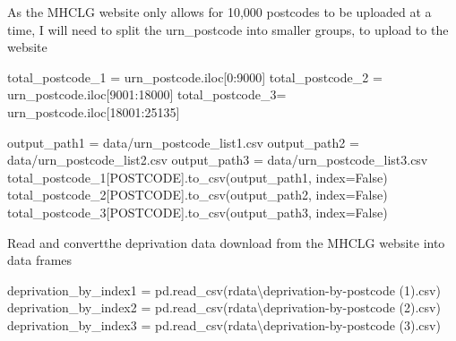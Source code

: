 \documentclass[
  letterpaper,
  DIV=11,
  numbers=noendperiod]{scrartcl}
\newenvironment{Shaded}{\begin{snugshade}}{\end{snugshade}}
\newcommand{\DecValTok}[1]{\textcolor[rgb]{0.68,0.00,0.00}{#1}}
\newcommand{\NormalTok}[1]{\textcolor[rgb]{0.00,0.23,0.31}{#1}}
\newcommand{\OperatorTok}[1]{\textcolor[rgb]{0.37,0.37,0.37}{#1}}
\newcommand{\StringTok}[1]{\textcolor[rgb]{0.13,0.47,0.30}{#1}}
\newcommand{\VariableTok}[1]{\textcolor[rgb]{0.07,0.07,0.07}{#1}}
\newcommand{\VerbatimStringTok}[1]{\textcolor[rgb]{0.13,0.47,0.30}{#1}}
\begin{document}
As the MHCLG website only allows for 10,000 postcodes to be uploaded at
a time, I will need to split the urn\_postcode into smaller groups, to
upload to the website

\begin{Shaded}
\begin{Highlighting}[]
\NormalTok{total\_postcode\_1 }\OperatorTok{=}\NormalTok{ urn\_postcode.iloc[}\DecValTok{0}\NormalTok{:}\DecValTok{9000}\NormalTok{]}
\NormalTok{total\_postcode\_2 }\OperatorTok{=}\NormalTok{ urn\_postcode.iloc[}\DecValTok{9001}\NormalTok{:}\DecValTok{18000}\NormalTok{]}
\NormalTok{total\_postcode\_3}\OperatorTok{=}\NormalTok{ urn\_postcode.iloc[}\DecValTok{18001}\NormalTok{:}\DecValTok{25135}\NormalTok{]}

\NormalTok{output\_path1 }\OperatorTok{=} \StringTok{\textquotesingle{}data/urn\_postcode\_list1.csv\textquotesingle{}}
\NormalTok{output\_path2 }\OperatorTok{=} \StringTok{\textquotesingle{}data/urn\_postcode\_list2.csv\textquotesingle{}}
\NormalTok{output\_path3 }\OperatorTok{=} \StringTok{\textquotesingle{}data/urn\_postcode\_list3.csv\textquotesingle{}}
\NormalTok{total\_postcode\_1[}\StringTok{\textquotesingle{}POSTCODE\textquotesingle{}}\NormalTok{].to\_csv(output\_path1, index}\OperatorTok{=}\VariableTok{False}\NormalTok{)}
\NormalTok{total\_postcode\_2[}\StringTok{\textquotesingle{}POSTCODE\textquotesingle{}}\NormalTok{].to\_csv(output\_path2, index}\OperatorTok{=}\VariableTok{False}\NormalTok{)}
\NormalTok{total\_postcode\_3[}\StringTok{\textquotesingle{}POSTCODE\textquotesingle{}}\NormalTok{].to\_csv(output\_path3, index}\OperatorTok{=}\VariableTok{False}\NormalTok{)}
\end{Highlighting}
\end{Shaded}

Read and convertthe deprivation data download from the MHCLG website
into data frames

\begin{Shaded}
\begin{Highlighting}[]
\NormalTok{deprivation\_by\_index1 }\OperatorTok{=}\NormalTok{ pd.read\_csv(}\VerbatimStringTok{r\textquotesingle{}data\textbackslash{}deprivation{-}by{-}postcode (1).csv\textquotesingle{}}\NormalTok{)}
\NormalTok{deprivation\_by\_index2 }\OperatorTok{=}\NormalTok{ pd.read\_csv(}\VerbatimStringTok{r\textquotesingle{}data\textbackslash{}deprivation{-}by{-}postcode (2).csv\textquotesingle{}}\NormalTok{)}
\NormalTok{deprivation\_by\_index3 }\OperatorTok{=}\NormalTok{ pd.read\_csv(}\VerbatimStringTok{r\textquotesingle{}data\textbackslash{}deprivation{-}by{-}postcode (3).csv\textquotesingle{}}\NormalTok{)}
\end{Highlighting}
\end{Shaded}
\end{document}
